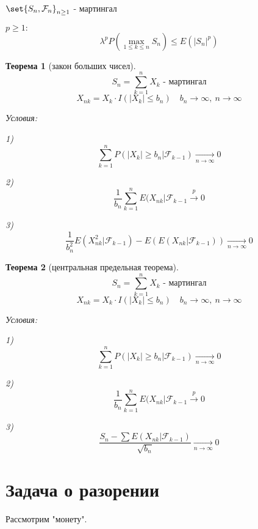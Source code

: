 \documentclass[a4paper]{article}
\DeclarePairedDelimiter\set\{\}
\newtheorem*{theorem}{Теорема}
\theoremstyle{definition}
\theoremstyle{remark}
\begin{document}
$ \set{S_n, \mathcal{F}_n}_{n \geq 1} $ - мартингал

$ p \geq 1: $ 
\[
    \lambda^{p} P(\max_{1 \leq k \leq n} S_n) \leq E(|S_n|^{p})
\]

\begin{tcolorbox}
    \begin{theorem}[закон больших чисел]
        \[
            S_n = \sum_{k=1}^{n} X_k \text{ - мартингал}
        \]
        \[
            X_{nk} = X_k \cdot I(|X_k| \leq b_n) \quad b_n \to \infty, \ n \to \infty
        \]

        Условия:

        1) \[
            \sum_{k=1}^{n} P(|X_k| \geq b_n | \mathcal{F}_{k-1})
            \xrightarrow[n\to \infty]{} 0
        \]

        2) \[
            \frac{1}{b_n} \sum_{k=1}^{n} E(X_{nk}|\mathcal{F}_{k-1} \xrightarrow{p} 0
        \]

        3) \[
            \frac{1}{b_n^2} E(X_{nk}^2|\mathcal{F}_{k-1}) - 
            E(E(X_{nk}|\mathcal{F}_{k-1})) \xrightarrow[n\to \infty]{} 0
        \]
    \end{theorem}
\end{tcolorbox}

\begin{tcolorbox}
    \begin{theorem}[центральная предельная теорема]
        \[
            S_n = \sum_{k=1}^{n} X_k \text{ - мартингал}
        \]
        \[
            X_{nk} = X_k \cdot I(|X_k| \leq b_n) \quad b_n \to \infty, \ n \to \infty
        \]

        Условия:

        1) \[
            \sum_{k=1}^{n} P(|X_k| \geq b_n | \mathcal{F}_{k-1})
            \xrightarrow[n\to \infty]{} 0
        \]

        2) \[
            \frac{1}{b_n} \sum_{k=1}^{n} E(X_{nk}|\mathcal{F}_{k-1} \xrightarrow{p} 0
        \]

        3) \[
        \frac{S_n - \sum E(X_{nk}|\mathcal{F}_{k-1})}{\sqrt{b_n} } 
        \xrightarrow[n\to \infty]{} 0
        \]
    \end{theorem}
\end{tcolorbox}

\section*{\centering Задача о разорении}

Рассмотрим "монету".
\end{document}
